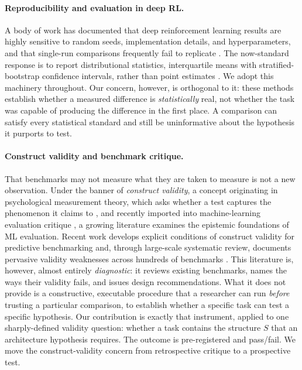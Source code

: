 \documentclass[10pt]{article}
\begin{document}
\paragraph{Reproducibility and evaluation in deep RL.} A body of work has documented that
deep reinforcement learning results are highly sensitive to random seeds, implementation
details, and hyperparameters, and that single-run comparisons frequently fail to replicate
\citep{henderson2018matters}. The now-standard response is to report distributional
statistics, interquartile means with stratified-bootstrap confidence intervals, rather than
point estimates \citep{agarwal2021precipice}. We adopt this machinery throughout. Our
concern, however, is orthogonal to it: these methods establish whether a measured difference
is \emph{statistically} real, not whether the task was capable of producing the difference
in the first place. A comparison can satisfy every statistical standard and still be
uninformative about the hypothesis it purports to test.

\paragraph{Construct validity and benchmark critique.} That benchmarks may not measure what
they are taken to measure is not a new observation. Under the banner of \emph{construct
validity}, a concept originating in psychological measurement theory, which asks whether a
test captures the phenomenon it claims to \citep{cronbach1955construct}, and recently
imported into machine-learning evaluation critique \citep{raji2021everything}, a growing
literature examines the epistemic foundations of ML evaluation. Recent work develops
explicit conditions of construct validity for predictive benchmarking
\citep{freiesleben2025benchmarking} and, through large-scale systematic review, documents
pervasive validity weaknesses across hundreds of benchmarks \citep{bean2025measuring}. This
literature is, however, almost entirely \emph{diagnostic}: it reviews existing benchmarks,
names the ways their validity fails, and issues design recommendations. What it does not
provide is a constructive, executable procedure that a researcher can run \emph{before}
trusting a particular comparison, to establish whether a specific task can test a specific
hypothesis. Our contribution is exactly that instrument, applied to one sharply-defined
validity question: whether a task contains the structure $S$ that an architecture hypothesis
requires. The outcome is pre-registered and pass/fail. We move the construct-validity
concern from retrospective critique to a prospective test.
\end{document}
